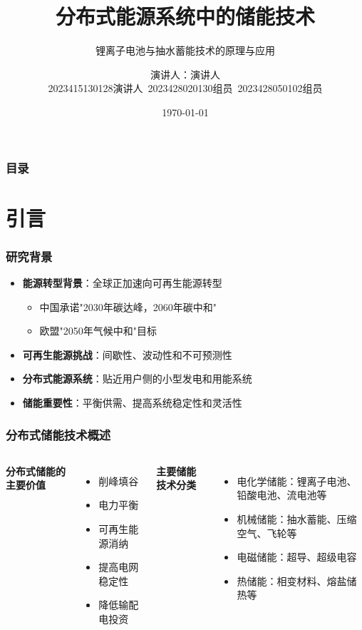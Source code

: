 \documentclass[aspectratio=169]{beamer}
\title{分布式能源系统中的储能技术}
\subtitle{锂离子电池与抽水蓄能技术的原理与应用}
\author{演讲人：演讲人 \\ 2023415130128演讲人~2023428020130组员~2023428050102组员}
\institute{东莞理工学院\\化学工程与能源技术学院}
\date{\today}
\begin{document}
\begin{frame}
    \titlepage
\end{frame}

\begin{frame}
    \frametitle{目录}
    \tableofcontents
\end{frame}

\section{引言}
\begin{frame}
    \frametitle{研究背景}
    \begin{itemize}
        \item \textbf{能源转型背景}：全球正加速向可再生能源转型 \cite{ref1,ref3}
        \begin{itemize}
            \item 中国承诺"2030年碳达峰，2060年碳中和" \cite{ref1}
            \item 欧盟"2050年气候中和"目标 \cite{ref3}
        \end{itemize}
        \item \textbf{可再生能源挑战}：间歇性、波动性和不可预测性 \cite{ref4}
        \item \textbf{分布式能源系统}：贴近用户侧的小型发电和用能系统 \cite{ref5}
        \item \textbf{储能重要性}：平衡供需、提高系统稳定性和灵活性 \cite{ref2,ref6}
    \end{itemize}
\end{frame}

\begin{frame}
    \frametitle{分布式储能技术概述}
    \begin{columns}
        \textbf{分布式储能的主要价值}
        \begin{itemize}
            \item 削峰填谷
            \item 电力平衡
            \item 可再生能源消纳
            \item 提高电网稳定性
            \item 降低输配电投资
        \end{itemize}
        
        \textbf{主要储能技术分类}
        \begin{itemize}
            \item 电化学储能：锂离子电池、铅酸电池、流电池等
            \item 机械储能：抽水蓄能、压缩空气、飞轮等
            \item 电磁储能：超导、超级电容
            \item 热储能：相变材料、熔盐储热等
        \end{itemize}
    \end{columns}
\end{frame}
\end{document}
